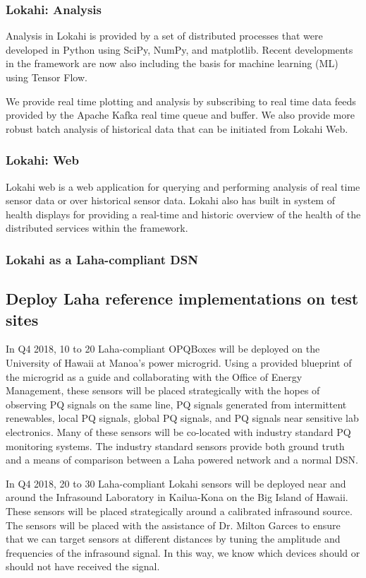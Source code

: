 \subsubsection{Lokahi: Analysis}
Analysis in Lokahi is provided by a set of distributed processes that were developed in Python using SciPy, NumPy, and matplotlib. Recent developments in the framework are now also including the basis for machine learning (ML) using Tensor Flow.

We provide real time plotting and analysis by subscribing to real time data feeds provided by the Apache Kafka real time queue and buffer. We also provide more robust batch analysis of historical data that can be initiated from Lokahi Web.


\subsubsection{Lokahi: Web}
Lokahi web is a web application for querying and performing analysis of real time sensor data or over historical sensor data. Lokahi also has built in system of health displays for providing a real-time and historic overview of the health of the distributed services within the framework. 


\subsubsection{Lokahi as a Laha-compliant DSN}

\subsection{Deploy Laha reference implementations on test sites}
In Q4 2018, 10 to 20 Laha-compliant OPQBoxes will be deployed on the University of Hawaii at Manoa's power microgrid. Using a provided blueprint of the microgrid as a guide and collaborating with the Office of Energy Management, these sensors will be placed strategically with the hopes of observing PQ signals on the same line, PQ signals generated from intermittent renewables, local PQ signals, global PQ signals, and PQ signals near sensitive lab electronics. Many of these sensors will be co-located with industry standard PQ monitoring systems. The industry standard sensors provide both ground truth and a means of comparison between a Laha powered network and a normal DSN. 

In Q4 2018,  20 to 30 Laha-compliant Lokahi sensors will be deployed near and around the Infrasound Laboratory in Kailua-Kona on the Big Island of Hawaii. These sensors will be placed strategically around a calibrated infrasound source. The sensors will be placed with the assistance of Dr. Milton Garces to ensure that we can target sensors at different distances by tuning the amplitude and frequencies of the infrasound signal. In this way, we know which devices should or should not have received the signal.

